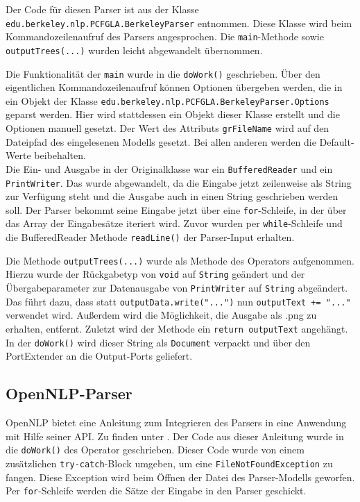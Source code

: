 Der Code für diesen Parser ist aus der Klasse \texttt{edu.berkeley.nlp.PCFGLA.BerkeleyParser} entnommen. Diese Klasse wird beim Kommandozeilenaufruf des Parsers angesprochen. Die \texttt{main}-Methode sowie \texttt{outputTrees(...)} wurden leicht abgewandelt übernommen. 

Die Funktionalität der \texttt{main} wurde in die \texttt{doWork()} geschrieben. Über den eigentlichen Kommandozeilenaufruf können Optionen übergeben werden, die in ein Objekt der Klasse \texttt{edu.berkeley.nlp.PCFGLA.BerkeleyParser.Options} geparst werden. Hier wird stattdessen ein Objekt dieser Klasse erstellt und die Optionen manuell gesetzt. Der Wert des Attributs \texttt{grFileName} wird auf den Dateipfad des eingelesenen Modells gesetzt. Bei allen anderen werden die Default-Werte beibehalten.\\ 
Die Ein- und Ausgabe in der Originalklasse war ein \texttt{BufferedReader} und ein \texttt{PrintWriter}. Das wurde abgewandelt, da die Eingabe jetzt zeilenweise als String zur Verfügung steht und die Ausgabe auch in einen String geschrieben werden soll. Der Parser bekommt seine Eingabe jetzt über eine \texttt{for}-Schleife, in der über das Array der Eingabesätze iteriert wird. Zuvor wurden per \texttt{while}-Schleife und die BufferedReader Methode \texttt{readLine()} der Parser-Input erhalten.

Die Methode \texttt{outputTrees(...)} wurde als Methode des Operators aufgenommen. Hierzu wurde der Rückgabetyp von \texttt{void} auf \texttt{String} geändert und der Übergabeparameter zur Datenausgabe von \texttt{PrintWriter} auf \texttt{String} abgeändert. Das führt dazu, dass statt \texttt{outputData.write("...")} nun \texttt{outputText += "..."} verwendet wird. Außerdem wird die Möglichkeit, die Ausgabe als .png zu erhalten, entfernt. Zuletzt wird der Methode ein \texttt{return outputText} angehängt. In der \texttt{doWork()} wird dieser String als \texttt{Document} verpackt und über den PortExtender an die Output-Ports geliefert.

\subsection{OpenNLP-Parser}
\label{sec:impl:eigene:opennlp}

OpenNLP bietet eine Anleitung zum Integrieren des Parsers in eine Anwendung mit Hilfe seiner API. Zu finden unter \cite{openNlpManual}. %
Der Code aus dieser Anleitung wurde in die \texttt{doWork()} des Operator geschrieben. Dieser Code wurde von einem zusätzlichen \texttt{try-catch}-Block umgeben, um eine \texttt{FileNotFoundException} zu fangen. Diese Exception wird beim Öffnen der Datei des Parser-Modells geworfen. Per \texttt{for}-Schleife werden die Sätze der Eingabe in den Parser geschickt. 


